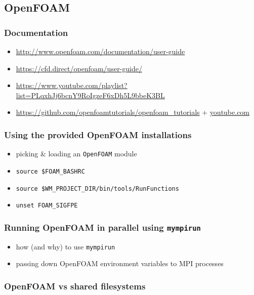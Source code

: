 \subsection{OpenFOAM}
\label{sec:best-practices-openfoam}

\subsubsection{Documentation}

\begin{itemize}
\item \url{http://www.openfoam.com/documentation/user-guide}
\item \url{https://cfd.direct/openfoam/user-guide/}
\item \url{https://www.youtube.com/playlist?list=PLqxhJj6bcnY9RoIgzeF6xDh5L9bbeK3BL}
\item \url{https://github.com/openfoamtutorials/openfoam\_tutorials} + \url{youtube.com}
\end{itemize}

\subsubsection{Using the provided OpenFOAM installations}

\begin{itemize}
\item picking \& loading an \texttt{OpenFOAM} module
\item \texttt{source \$FOAM\_BASHRC}
\item \texttt{source \$WM\_PROJECT\_DIR/bin/tools/RunFunctions}
\item \texttt{unset FOAM\_SIGFPE}
\end{itemize}

\subsubsection{Running OpenFOAM in parallel using \texttt{mympirun}}

\begin{itemize}
\item how (and why) to use \texttt{mympirun}
\item passing down OpenFOAM environment variables to MPI processes
\end{itemize}

\subsubsection{OpenFOAM vs shared filesystems}

